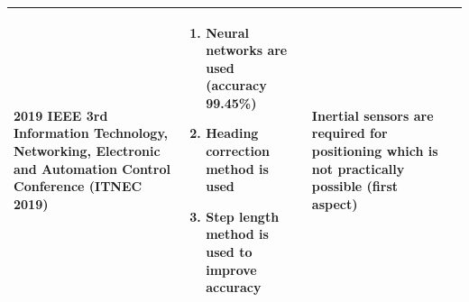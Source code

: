 ﻿\documentclass[a4paper, 12pt]{article}
\begin{document}
\begin{tabular}{|p{107pt}|p{107pt}|p{107pt}|p{107pt}|}
	\parbox{107pt}{\raggedright 2019 IEEE 3rd Information Technology, Networking, Electronic and Automation Control Conference (ITNEC 2019)} & 
	\parbox{107pt}{\raggedright 
		\begin{enumerate}
			\item Neural networks are used (accuracy 99.45\%)
			\item Heading correction method is used
			\item Step length method is used to improve accuracy
	\end{enumerate}} & 
	\parbox{107pt}{\raggedright Inertial sensors are required for positioning which is not practically possible (first aspect)} \\
	\hline
\end{tabular}
\vspace{2pt}

\pagebreak
\end{document}

